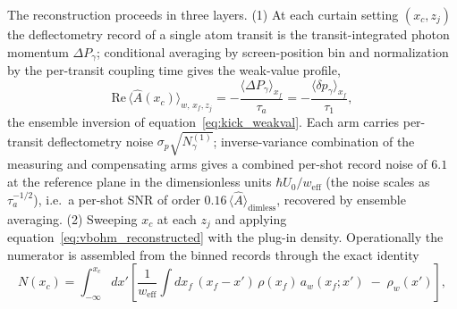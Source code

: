 \documentclass[11pt,a4paper]{article}
\newcommand{\weakvalps}[2]{\langle #1 \rangle_{w,\,#2}}
\begin{document}
The reconstruction proceeds in three layers. (1) At each curtain setting $(x_c, z_j)$ the deflectometry record of a single atom transit is the transit-integrated photon momentum $\Delta P_\gamma$; conditional averaging by screen-position bin and normalization by the per-transit coupling time gives the weak-value profile,
\begin{equation}
\mathrm{Re}\,\weakvalps{\hat{A}(x_c)}{x_f, z_j} = -\frac{\langle\Delta P_\gamma\rangle_{x_f}}{\tau_a} = -\frac{\langle\delta p_\gamma\rangle_{x_f}}{\tau_1},
\label{eq:layer1}
\end{equation}
the ensemble inversion of equation~\eqref{eq:kick_weakval}. Each arm carries per-transit deflectometry noise $\sigma_p\sqrt{N_\gamma^{(1)}}$; inverse-variance combination of the measuring and compensating arms gives a combined per-shot record noise of $6.1$ at the reference plane in the dimensionless units $\hbar U_0/w_\text{eff}$ (the noise scales as $\tau_a^{-1/2}$), i.e.\ a per-shot SNR of order $0.16\,\langle\hat A\rangle_\text{dimless}$, recovered by ensemble averaging. (2) Sweeping $x_c$ at each $z_j$ and applying equation~\eqref{eq:vbohm_reconstructed} with the plug-in density. Operationally the numerator is assembled from the binned records through the exact identity
\begin{equation}
N(x_c) = \int_{-\infty}^{x_c}\!dx'\left[\frac{1}{w_\text{eff}}\int\!dx_f\,(x_f - x')\,\rho(x_f)\,a_w(x_f; x') \;-\; \rho_w(x')\right],
\label{eq:cumulative_estimator}
\end{equation}
\end{document}
